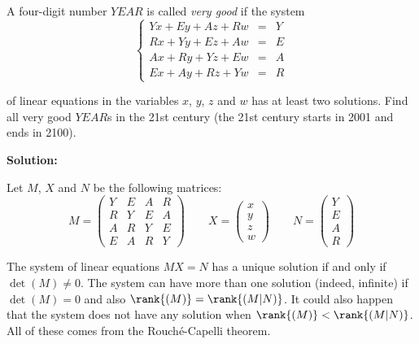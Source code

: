 \documentclass[../../main.tex]{subfiles}
\begin{document}
  \begin{shaded}
    A four-digit number $YEAR$ is called \textit{very good} if the system
    $$
    \left \{
      \begin{matrix}
        Y x + E y + A z + R w & = & Y \\
        R x + Y y + E z + A w & = & E \\
        A x + R y + Y z + E w & = & A \\
        E x + A y + R z + Y w & = & R
      \end{matrix}
    \right .
    $$

    of linear equations in the variables $x$, $y$, $z$ and $w$ has at least two solutions. Find all very good $YEAR$s in the 21st century (the 21st century starts in 2001 and ends in 2100).
  \end{shaded}

  \textbf{Solution:}

  Let $M$, $X$ and $N$ be the following matrices:
  $$
  M = \left(
    \begin{matrix}
      Y & E & A & R \\
      R & Y & E & A \\
      A & R & Y & E \\
      E & A & R & Y
    \end{matrix}
  \right) \quad\quad X =
  \left(
    \begin{matrix}
      x \\
      y \\
      z \\
      w
    \end{matrix}
  \right) \quad\quad N =
  \left(
    \begin{matrix}
      Y \\
      E \\
      A \\
      R
    \end{matrix}
  \right)
  $$

  The system of linear equations $M X = N$ has a unique solution if and only if $\det{(M)} \ne 0$. The system can have more than one solution (indeed, infinite) if $\det{(M)} = 0$ and also $\rank{(M)} = \rank{(M | N)}$. It could also happen that the system does not have any solution when $\rank{(M)} < \rank{(M | N)}$. All of these comes from the Rouché-Capelli theorem.
\end{document}
